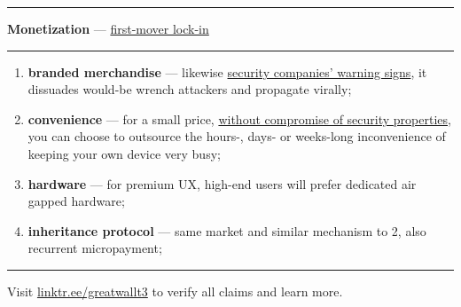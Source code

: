 \documentclass[8pt]{article}
\newcommand{\faqurl}{https://tr.ee/gwfaq}
\newcommand{\privsecplaque}{https://duckduckgo.com/?q=prosegur+verisure+\%22warning+sign\%22+facade\&iar=images\&t=brave\&iaf=type\%3Aphoto}
\begin{document}
{\color{accent}\hrule}
\vspace{0.2cm}
{\Large\textbf{Monetization} --- \href{\faqurl}{first-mover lock-in}}
\vspace{0.2cm}
{\color{accent}\hrule}
\vspace{0.3cm}

\begin{enumerate}
 \item \textbf{branded merchandise} --- likewise \href{\privsecplaque}{security companies' warning signs}, it dissuades would-be wrench attackers and propagate virally;
 \item \textbf{convenience} --- for a small price, \href{\faqurl}{without compromise of security properties}, you can choose to outsource the hours-, days- or weeks-long inconvenience of keeping your own device very busy;
 \item \textbf{hardware} --- for premium UX, high-end users will prefer dedicated air gapped hardware;
 \item \textbf{inheritance protocol} --- same market and similar mechanism to 2, also recurrent micropayment;
\end{enumerate}


\noindent
{\color{accent}\rule{\linewidth}{0.5mm}}
\begin{center}
Visit \href{https://linktr.ee/greatwallt3}{linktr.ee/greatwallt3} to verify all claims and learn more.
\end{center}
\end{document}
